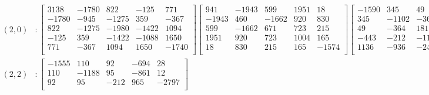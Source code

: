 \documentclass[12pt]{amsart}
\theoremstyle{plain}
\theoremstyle{definition}
\begin{document}
\begin{landscape}
\thispagestyle{empty}
\tiny
\begin{align*} 
(2,0) &:
\begin{bmatrix}
3138  &   -1780  &   822  &   -125  &   771  \\ 
 -1780  &   -945  &   -1275  &   359  &   -367  \\ 
 822  &   -1275  &   -1980  &   -1422  &   1094  \\ 
 -125  &   359  &   -1422  &   -1088  &   1650  \\ 
 771  &   -367  &   1094  &   1650  &   -1740  \\ 
\end{bmatrix}
\begin{bmatrix}
941  &   -1943  &   599  &   1951  &   18  \\ 
 -1943  &   460  &   -1662  &   920  &   830  \\ 
 599  &   -1662  &   671  &   723  &   215  \\ 
 1951  &   920  &   723  &   1004  &   165  \\ 
 18  &   830  &   215  &   165  &   -1574  \\ 
\end{bmatrix}
\begin{bmatrix}
-1590  &   345  &   49  &   -443  &   1136  \\ 
 345  &   -1102  &   -364  &   -212  &   -936  \\ 
 49  &   -364  &   181  &   -1124  &   -2491  \\ 
 -443  &   -212  &   -1124  &   860  &   370  \\ 
 1136  &   -936  &   -2491  &   370  &   -1570  \\ 
\end{bmatrix}
\begin{bmatrix}
1  &   0  &   0  &   0  &   0  \\ 
 0  &   1  &   0  &   0  &   0  \\ 
 0  &   0  &   1  &   0  &   0  \\ 
 0  &   0  &   0  &   1  &   0  \\ 
 0  &   0  &   0  &   0  &   1  \\ 
\end{bmatrix} \\
(2,2) &:
\begin{bmatrix}
-1555  &   110  &   92  &   -694  &   28  \\ 
 110  &   -1188  &   95  &   -861  &   12  \\ 
 92  &   95  &   -212  &   965  &   -2797  \\ 

\end{bmatrix}
\end{align*}
\end{landscape}
\end{document}
